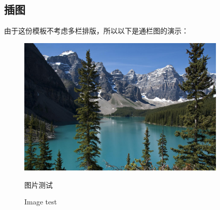 \subsection{插图}
\par 由于这份模板不考虑多栏排版，所以以下是通栏图的演示：
\begin{figure}[H]
    \centering
    \includegraphics[width=100mm]{./figures/Example.jpg}
    \caption{图片测试} 
    
    \addtocounter{figure}{-1}
    \vspace{-5pt}
    \renewcommand{\figurename}{Figure}
    \caption{Image test}
    
\end{figure}


